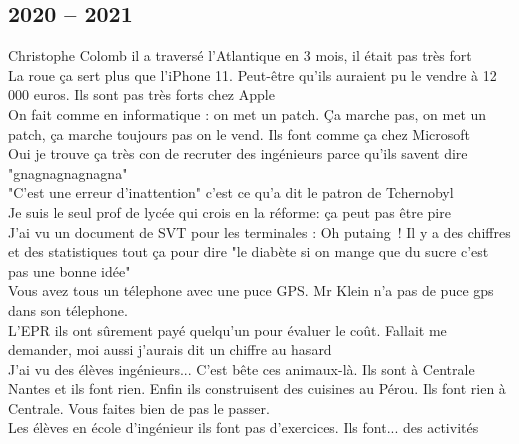 \documentclass[french, a4paper, openany]{book}
\begin{document}
	\subsection*{2020 -- 2021}
		\noindent \og Christophe Colomb il a traversé l'Atlantique en 3 mois, il était pas très fort \fg \\
		\og La roue ça sert plus que l'iPhone 11. Peut-être qu'ils auraient pu le vendre à 12 000 euros. Ils sont pas très forts chez Apple \fg \\
		\og On fait comme en informatique : on met un patch. Ça marche pas, on met un patch, ça marche toujours pas on le vend. Ils font comme ça chez Microsoft \fg \\
		\og Oui je trouve ça très con de recruter des ingénieurs parce qu'ils savent dire "gnagnagnagnagna" \fg \\
		\og "C'est une erreur d'inattention" c'est ce qu'a dit le patron de Tchernobyl \fg \\
		\og Je suis le seul prof de lycée qui crois en la réforme: ça peut pas être pire \fg \\
		\og J'ai vu un document de SVT pour les terminales : Oh putaing~! Il y a des chiffres et des statistiques tout ça pour dire "le diabète si on mange que du sucre c'est pas une bonne idée" \fg \\
		\og Vous avez tous un télephone avec une puce GPS. Mr Klein n'a pas de puce gps dans son télephone. \fg \\
		\og L'EPR ils ont sûrement payé quelqu'un pour évaluer le coût. Fallait me demander, moi aussi j'aurais dit un chiffre au hasard \fg \\
		\og J'ai vu des élèves ingénieurs... C'est bête ces animaux-là. Ils sont à Centrale Nantes et ils font rien. Enfin ils construisent des cuisines au Pérou. Ils font rien à Centrale. Vous faites bien de pas le passer. \fg \\
		\og Les élèves en école d'ingénieur ils font pas d'exercices. Ils font... des activités \fg \\
\end{document}
